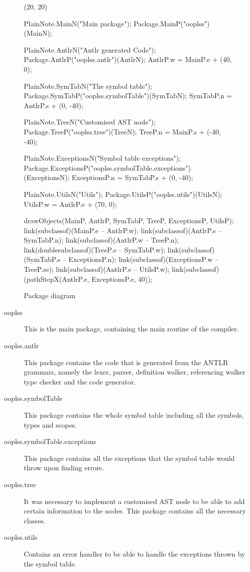 \begin{figure}[H]
\centering
	\begin{emp}[classdiag](20, 20)

	PlainNote.MainN("Main package");
	Package.MainP("ooplss")(MainN);

	PlainNote.AntlrN("Antlr generated Code");
	Package.AntlrP("ooplss.antlr")(AntlrN);
	AntlrP.w = MainP.e + (40, 0);

	PlainNote.SymTabN("The symbol table");
	Package.SymTabP("ooplss.symbolTable")(SymTabN);
	SymTabP.n = AntlrP.s + (0, -40);

	PlainNote.TreeN("Customised AST node");
	Package.TreeP("ooplss.tree")(TreeN);
	TreeP.n = MainP.s + (-40, -40);

	PlainNote.ExceptionsN("Symbol table exceptions");
	Package.ExceptionsP("ooplss.symbolTable.exceptions")(ExceptionsN);
	ExceptionsP.n = SymTabP.s + (0, -40);

	PlainNote.UtilsN("Utils");
	Package.UtilsP("ooplss.utils")(UtilsN);
	UtilsP.w = AntlrP.e + (70, 0);

	drawObjects(MainP, AntlrP, SymTabP, TreeP, ExceptionsP, UtilsP);
	link(subclassof)(MainP.e -- AntlrP.w);
	link(subclassof)(AntlrP.s -- SymTabP.n);
	link(subclassof)(AntlrP.w -- TreeP.n);
	link(doublesubclassof)(TreeP.e -- SymTabP.w);
	link(subclassof)(SymTabP.s -- ExceptionsP.n);
	link(subclassof)(ExceptionsP.w -- TreeP.se);
	link(subclassof)(AntlrP.e -- UtilsP.w);
	link(subclassof)(pathStepX(AntlrP.e, ExceptionsP.e, 40));

	\end{emp}
	\caption{Package diagram}
	\label{fig:classes}
\end{figure}


\begin{description}
\item[ooplss] This is the main package, containing the main routine of the
compiler.
\item[ooplss.antlr] This package contains the code that is generated from the
ANTLR grammars, namely the lexer, parser, definition walker, referencing walker
type checker and the code generator.
\item[ooplss.symbolTable] This package contains the whole symbol table including
all the symbols, types and scopes.
\item[ooplss.symbolTable.exceptions] This package contains all the exceptions
that the symbol table would throw upon finding errors.
\item[ooplss.tree] It was necessary to implement a customised AST node to be
able to add certain information to the nodes. This package contains all the
necessary classes.
\item[ooplss.utils] Contains an error handler to be able to handle the
exceptions thrown by the symbol table.
\end{description}

